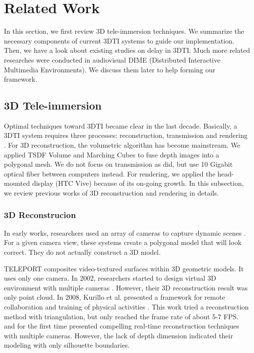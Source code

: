 \section{Related Work}

In this section, we first review 3D tele-immersion techniques. We summarize the necessary components of current 3DTI systems to guide our implementation. Then, we have a look about existing studies on delay in 3DTI. Much more related researches were conducted in audiovisual DIME (Distributed Interactive Multimedia Environments). We discuss them later to help forming our framework.

\subsection{3D Tele-immersion}

Optimal techniques toward 3DTI became clear in the last decade. Basically, a 3DTI system requires three processes: reconstruction, transmission and rendering \cite{fuchs2014immersive}. For 3D reconstruction, the volumetric algorithm has become mainstream. We applied TSDF Volume \cite{curless1996volumetric} and Marching Cubes \cite{lorensen1987marching} to fuse depth images into a polygonal mesh. We do not focus on transmission as \cite{beck2013immersive, pece2011adapting} did, but use 10 Gigabit optical fiber between computers instead. For rendering, we applied the head-mounted display (HTC Vive) because of its on-going growth. In this subsection, we review previous works of 3D reconstruction and rendering in details.

\subsubsection{3D Reconstrucion}

In early works, researchers used an array of cameras to capture dynamic scenes \cite{kanade1997virtualized, fuchs1994virtual}. For a given camera view, these systems create a polygonal model that will look correct. They do not actually construct a 3D model.

TELEPORT \cite{gibbs1999teleport} composites video-textured surfaces within 3D geometric models. It uses only one camera. In 2002, researchers started to design virtual 3D environment with multiple cameras \cite{gross2003blue, towles20023d}. However, their 3D reconstruction result was only point cloud. In 2008, Kurillo et al. presented a framework for remote collaboration and training of physical activities \cite{kurillo2008immersive}. This work tried a reconstruction method with triangulation, but only reached the frame rate of about 5-7 FPS. \cite{loop2013real} and \cite{petit2010multicamera} for the first time presented compelling real-time reconstruction techniques with multiple cameras. However, the lack of depth dimension indicated their modeling with only silhouette boundaries.


